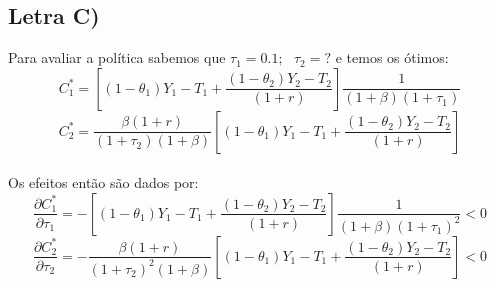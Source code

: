 \documentclass{article}
\begin{document}
\subsection*{Letra C)}
Para avaliar a política sabemos que $\tau_1=0.1; \>\>\> \tau_2=?$ e temos os ótimos:
\begin{equation}\label{eq:13cc1star}
    C_1^*=\left[(1-\theta_1)Y_1-T_1+\frac{(1-\theta_2)Y_2-T_2}{(1+r)}\right]\frac{1}{(1+\beta)(1+\tau_1)}
\end{equation}
\begin{equation}
    C_2^*=\frac{\beta(1+r)}{(1+\tau_2)(1+\beta)}\left[(1-\theta_1)Y_1-T_1+\frac{(1-\theta_2)Y_2-T_2}{(1+r)}\right]
\end{equation}
\\
Os efeitos então são dados por:
\begin{equation}
    \frac{\partial C_1^*}{\partial \tau_1} = -\left[(1-\theta_1)Y_1-T_1+\frac{(1-\theta_2)Y_2-T_2}{(1+r)}\right]\frac{1}{(1+\beta)(1+\tau_1)^2} < 0
\end{equation}
\begin{equation}
    \frac{\partial C_2^*}{\partial \tau_2} = -\frac{\beta(1+r)}{(1+\tau_2)^2(1+\beta)}\left[(1-\theta_1)Y_1-T_1+\frac{(1-\theta_2)Y_2-T_2}{(1+r)}\right] <0
\end{equation}
\end{document}
